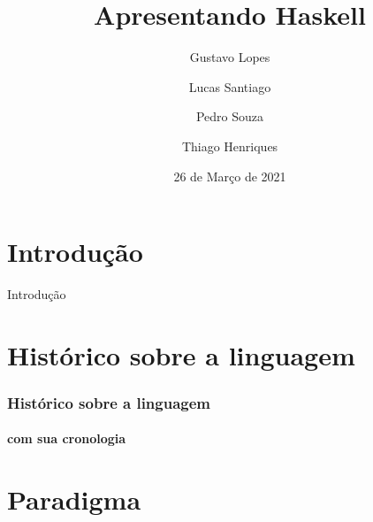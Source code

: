 \documentclass[aspectratio=169]{beamer}
\title{Apresentando Haskell}
\author{Gustavo Lopes \and Lucas Santiago \and Pedro Souza \and Thiago Henriques }
\institute{Pontifícia Universidade Católica de Minas Gerais}
\date{26 de Março de 2021}
\begin{document}



    \section{Introdução}

    \begin{frame}{Introdução}

    

    \end{frame}


    \section{Histórico sobre a linguagem}
    \begin{frame}

      \frametitle{Histórico sobre a linguagem}
      \framesubtitle{com sua cronologia}

    \end{frame}


    \section{Paradigma}
\end{document}
